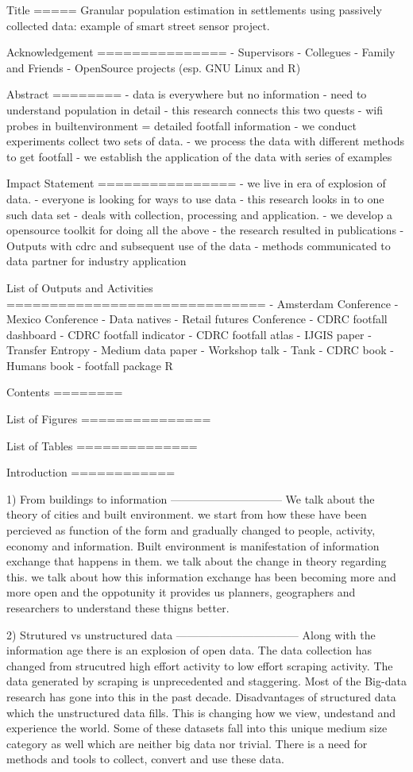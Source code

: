 Title
=====
Granular population estimation in settlements using passively collected data:
example of smart street sensor project.

Acknowledgement
===============
- Supervisors
- Collegues
- Family and Friends
- OpenSource projects
  (esp. GNU Linux and R)

Abstract
========
 - data is everywhere but no information
 - need to understand population in detail
 - this research connects this two quests
 - wifi probes in builtenvironment = detailed footfall information
 - we conduct experiments collect two sets of data.
 - we process the data with different methods to get footfall
 - we establish the application of the data with series of examples

Impact Statement
================
 - we live in era of explosion of data.
 - everyone is looking for ways to use data
 - this research looks in to one such data set
 - deals with collection, processing and application.
 - we develop a opensource toolkit for doing all the above
 - the research resulted in publications
 - Outputs with cdrc and subsequent use of the data 
 - methods communicated to data partner for industry application

List of Outputs and Activities
==============================
 - Amsterdam Conference
 - Mexico Conference
 - Data natives
 - Retail futures Conference 
 - CDRC footfall dashboard
 - CDRC footfall indicator
 - CDRC footfall atlas
 - IJGIS paper
 - Transfer Entropy
 - Medium data paper
 - Workshop talk - Tank
 - CDRC book
 - Humans book
 - footfall package R

Contents
========

List of Figures
===============

List of Tables
==============

Introduction
============

1) From buildings to information
------------------------------
We talk about the theory of cities and built environment.
we start from how these have been percieved as function of the
form and gradually changed to people, activity, economy and information.
Built environment is manifestation of information exchange that happens
in them. we talk about the change in theory regarding this. we talk about
how this information exchange has been becoming more and more open and
the oppotunity it provides us planners, geographers and researchers
to understand these thigns better.

2) Strutured vs unstructured data
---------------------------------
Along with the information age there is an explosion of open data.
The data collection has changed from strucutred high effort activity
to low effort scraping activity. The data generated by scraping is
unprecedented and staggering. Most of the Big-data research has gone into
this in the past decade. Disadvantages of structured data which the
unstructured data fills. This is changing how we view, undestand and experience
the world. Some of these datasets fall into this unique medium size category 
as well which are neither big data nor trivial. There is
a need for methods and tools to collect, convert and use these data.


